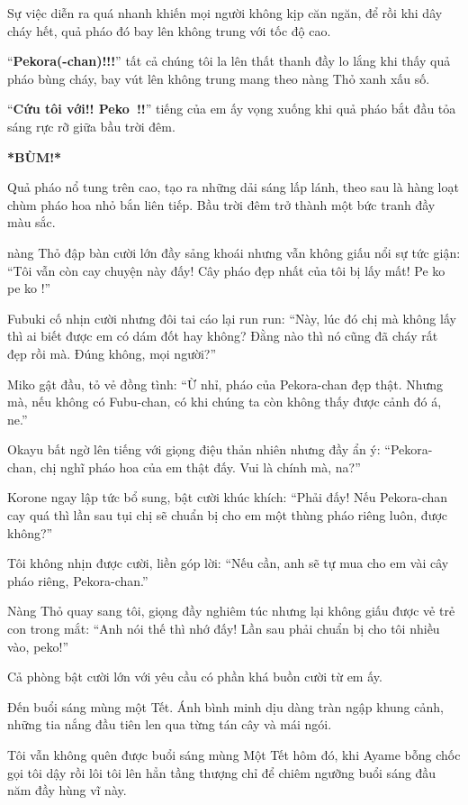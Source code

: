 \documentclass[../main.tex]{subfiles}
\begin{document}
Sự việc diễn ra quá nhanh khiến mọi người không kịp căn ngăn, để rồi khi dây cháy hết, quả pháo đó bay lên không trung với tốc độ cao.

``\textbf{Pekora(-chan)!!!}'' tất cả chúng tôi la lên thất thanh đầy lo lắng khi thấy quả pháo bùng cháy, bay vút lên không trung mang theo nàng Thỏ xanh xấu số.

``\textbf{Cứu tôi với!! Peko~!!}'' tiếng của em ấy vọng xuống khi quả pháo bắt đầu tỏa sáng rực rỡ giữa bầu trời đêm.

\textbf{*BÙM!*}

Quả pháo nổ tung trên cao, tạo ra những dải sáng lấp lánh, theo sau là hàng loạt chùm pháo hoa nhỏ bắn liên tiếp. Bầu trời đêm trở thành một bức tranh đầy màu sắc.

\il

nàng Thỏ đập bàn cười lớn đầy sảng khoái nhưng vẫn không giấu nổi sự tức giận: ``Tôi vẫn còn cay chuyện này đấy! Cây pháo đẹp nhất của tôi bị lấy mất! Pe \uparrow ko \downarrow pe \uparrow ko \downarrow!''

Fubuki cố nhịn cười nhưng đôi tai cáo lại run run: ``Này, lúc đó chị mà không lấy thì ai biết được em có dám đốt hay không? Đằng nào thì nó cũng đã cháy rất đẹp rồi mà. Đúng không, mọi người?''

Miko gật đầu, tỏ vẻ đồng tình: ``Ừ nhỉ, pháo của Pekora-chan đẹp thật. Nhưng mà, nếu không có Fubu-chan, có khi chúng ta còn không thấy được cảnh đó á, ne.''

Okayu bất ngờ lên tiếng với giọng điệu thản nhiên nhưng đầy ẩn ý: ``Pekora-chan, chị nghĩ pháo hoa của em thật đấy. Vui là chính mà, na?''

Korone ngay lập tức bổ sung, bật cười khúc khích: ``Phải đấy! Nếu Pekora-chan cay quá thì lần sau tụi chị sẽ chuẩn bị cho em một thùng pháo riêng luôn, được không?''

Tôi không nhịn được cười, liền góp lời: ``Nếu cần, anh sẽ tự mua cho em vài cây pháo riêng, Pekora-chan.''

Nàng Thỏ quay sang tôi, giọng đầy nghiêm túc nhưng lại không giấu được vẻ trẻ con trong mắt: ``Anh nói thế thì nhớ đấy! Lần sau phải chuẩn bị cho tôi nhiều vào, peko!''

Cả phòng bật cười lớn với yêu cầu có phần khá buồn cười từ em ấy.

Đến buổi sáng mùng một Tết. Ánh bình minh dịu dàng tràn ngập khung cảnh, những tia nắng đầu tiên len qua từng tán cây và mái ngói.

Tôi vẫn không quên được buổi sáng mùng Một Tết hôm đó, khi Ayame bỗng chốc gọi tôi dậy rồi lôi tôi lên hẳn tầng thượng chỉ để chiêm ngưỡng buổi sáng đầu năm đầy hùng vĩ này.
\end{document}
